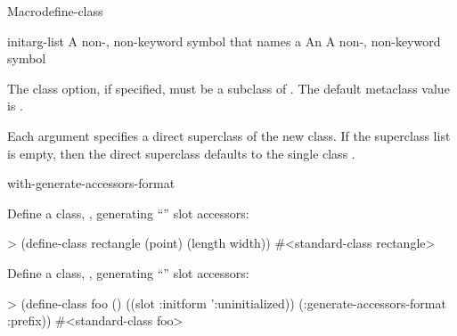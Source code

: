 \documentclass[10pt,twoside,english,pdftex]{article}
\begin{document}
\begin{functiondoc}{Macro}{define-class}
\fnterms
\begin{args}{initarg-list}
 A non-\nil, non-keyword symbol that names a
 An 
 A non-\nil, non-keyword symbol
\end{args}

\fndescription 
{}%
The  class option, if specified, must be a subclass
of .  The default metaclass value is
.

Each  argument specifies a direct superclass of
the new class. If the superclass list is empty, then the direct
superclass defaults to the single class .

\begin{alsos}{with-generate-accessors-format}
\end{alsos}

\fnexamples
Define a class, , generating ``'' slot accessors:
\begin{example}
> (define-class rectangle (point)
    (length width))
#<standard-class rectangle>
\end{example}

Define a class, , generating
``'' slot accessors:
\begin{example}
> (define-class foo ()
    ((slot :initform ':uninitialized))
    (:generate-accessors-format :prefix))
#<standard-class foo>
\end{example}

\end{functiondoc}

\end{document}
